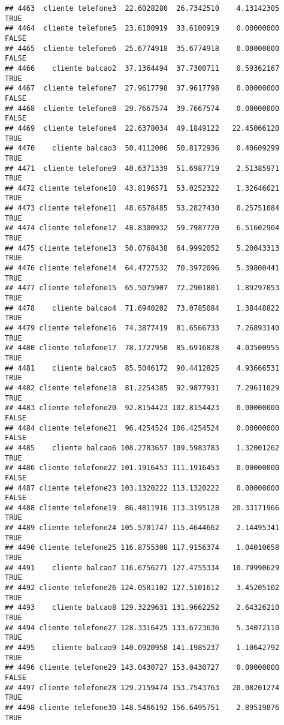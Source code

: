 \documentclass[
]{article}
\begin{document}
\begin{verbatim}
## 4463  cliente telefone3  22.6028280  26.7342510    4.13142305     TRUE
## 4464  cliente telefone5  23.6100919  33.6100919    0.00000000    FALSE
## 4465  cliente telefone6  25.6774918  35.6774918    0.00000000    FALSE
## 4466    cliente balcao2  37.1364494  37.7300711    0.59362167     TRUE
## 4467  cliente telefone7  27.9617798  37.9617798    0.00000000    FALSE
## 4468  cliente telefone8  29.7667574  39.7667574    0.00000000    FALSE
## 4469  cliente telefone4  22.6378034  49.1849122   22.45066120     TRUE
## 4470    cliente balcao3  50.4112006  50.8172936    0.40609299     TRUE
## 4471  cliente telefone9  40.6371339  51.6987719    2.51385971     TRUE
## 4472 cliente telefone10  43.8196571  53.0252322    1.32646021     TRUE
## 4473 cliente telefone11  48.6578485  53.2827430    0.25751084     TRUE
## 4474 cliente telefone12  48.8300932  59.7987720    6.51602904     TRUE
## 4475 cliente telefone13  50.0768438  64.9992052    5.20043313     TRUE
## 4476 cliente telefone14  64.4727532  70.3972096    5.39800441     TRUE
## 4477 cliente telefone15  65.5075907  72.2901801    1.89297053     TRUE
## 4478    cliente balcao4  71.6940202  73.0785084    1.38448822     TRUE
## 4479 cliente telefone16  74.3877419  81.6566733    7.26893140     TRUE
## 4480 cliente telefone17  78.1727950  85.6916828    4.03500955     TRUE
## 4481    cliente balcao5  85.5046172  90.4412825    4.93666531     TRUE
## 4482 cliente telefone18  81.2254385  92.9877931    7.29611029     TRUE
## 4483 cliente telefone20  92.8154423 102.8154423    0.00000000    FALSE
## 4484 cliente telefone21  96.4254524 106.4254524    0.00000000    FALSE
## 4485    cliente balcao6 108.2783657 109.5983783    1.32001262     TRUE
## 4486 cliente telefone22 101.1916453 111.1916453    0.00000000    FALSE
## 4487 cliente telefone23 103.1320222 113.1320222    0.00000000    FALSE
## 4488 cliente telefone19  86.4811916 113.3195128   20.33171966     TRUE
## 4489 cliente telefone24 105.5701747 115.4644662    2.14495341     TRUE
## 4490 cliente telefone25 116.8755308 117.9156374    1.04010658     TRUE
## 4491    cliente balcao7 116.6756271 127.4755334   10.79990629     TRUE
## 4492 cliente telefone26 124.0581102 127.5101612    3.45205102     TRUE
## 4493    cliente balcao8 129.3229631 131.9662252    2.64326210     TRUE
## 4494 cliente telefone27 128.3316425 133.6723636    5.34072110     TRUE
## 4495    cliente balcao9 140.0920958 141.1985237    1.10642792     TRUE
## 4496 cliente telefone29 143.0430727 153.0430727    0.00000000    FALSE
## 4497 cliente telefone28 129.2159474 153.7543763   20.08201274     TRUE
## 4498 cliente telefone30 148.5466192 156.6495751    2.89519876     TRUE

\end{verbatim}
\end{document}
